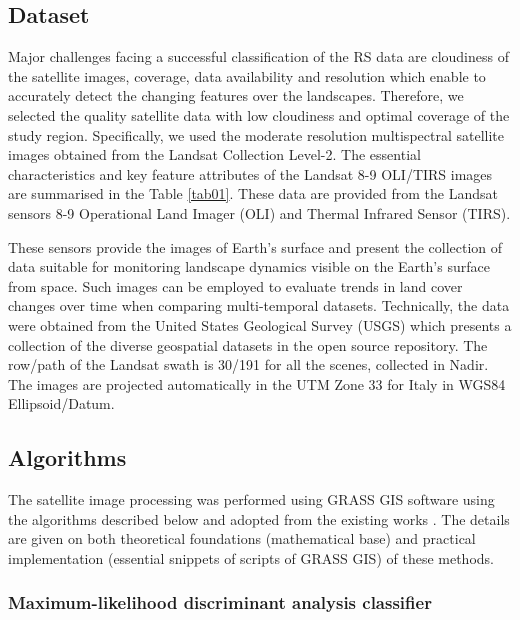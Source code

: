\documentclass[preprint,12pt,authoryear]{elsarticle}
\begin{document}
\subsection{Dataset}

Major challenges facing a successful classification of the RS data are cloudiness of the satellite images, coverage, data availability and resolution which enable to accurately detect the changing features over the landscapes. Therefore, we selected the quality satellite data with low cloudiness and optimal coverage of the study region. Specifically, we used the moderate resolution multispectral satellite images obtained from the Landsat Collection Level-2. The essential characteristics and key feature attributes of the Landsat 8-9 OLI/TIRS images are summarised in the Table \ref{tab01}. These data are provided from the Landsat sensors 8-9 Operational Land Imager (OLI) and Thermal Infrared Sensor (TIRS). 

These sensors provide the images of Earth's surface and present the collection of data suitable for monitoring landscape dynamics visible on the Earth's surface from space. Such images can be employed to evaluate trends in land cover changes over time when comparing multi-temporal datasets. Technically, the data were obtained from the United States Geological Survey (USGS) which presents a collection of the diverse geospatial datasets in the open source repository. The row/path of the Landsat swath is 30/191 for all the scenes, collected in Nadir. The images are projected automatically in the UTM Zone 33 for Italy in WGS84 Ellipsoid/Datum. 

\subsection{Algorithms}

The satellite image processing was performed using GRASS GIS software using the algorithms described below and adopted from the existing works \cite{Lemenkova202217,Lemenkova202313}. The details are given on both theoretical foundations (mathematical base) and practical implementation (essential snippets of scripts of GRASS GIS) of these methods.

\subsubsection{Maximum-likelihood discriminant analysis classifier}
\end{document}
